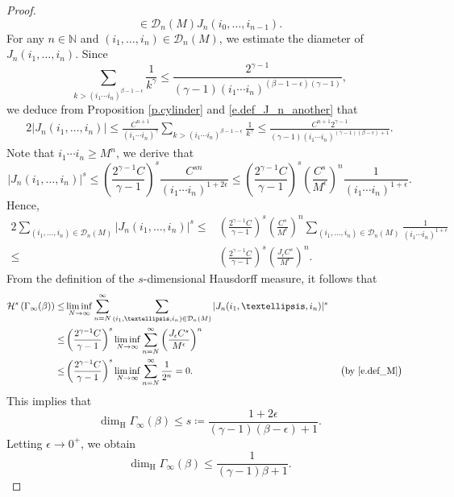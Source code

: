 \documentclass[10pt,a4paper]{amsart}
\begin{document}
\begin{proof}
\begin{equation}
{                \in \mathcal{D}_n(M)}J_n(i_0,\dots,i_{n-1}).
        \end{equation}
For any $n \in \mathbb N$ and $(i_1,\dots, i_{n})\in \mathcal{D} _n(M)$, we estimate the diameter of $J_n(i_1,\dots,i_{n})$. Since
$$
\sum_{k>(i_1\cdots i_{n})
        ^{\beta-1-\epsilon}}\frac{1}{k^{\gamma}} \leq \frac{2^{\gamma-1}}
        {(\gamma-1)(i_1\cdots i_{n})^{(\beta-1-\epsilon)(\gamma-1)}},
$$
we deduce from Proposition \ref{p.cylinder} and \eqref{e.def_J_n_another} that
     \begin{alignat*}{2}
        |J_n(i_1,\dots,i_{n})|\leq\frac{C^{n+1}}
        {(i_1\cdots i_{n})^{\gamma}}
        \sum_{k>(i_1\cdots i_{n})
        ^{\beta-1-\epsilon}}\frac{1}{k^{\gamma}}
       \leq \frac{C^{n+1}2^{\gamma-1}}
        {(\gamma-1)(i_1\cdots i_{n})^{(\gamma-1)(\beta-\epsilon)+1}}.
        \end{alignat*}
Note that $i_1\cdots i_{n}\geq M^n$, we derive that
 \begin{equation*}\label{J^s}
|J_n(i_1,\dots,i_{n})|^s \leq \left(\frac{2^{\gamma-1}C}{\gamma-1}\right)^s \frac{C^{sn}}
        {(i_1\cdots i_{n})^{1+2\epsilon}} \leq \left(\frac{2^{\gamma-1}C}{\gamma-1}\right)^s \left(\frac{C^{s}}{M^\epsilon}\right)^n \frac{1}
        {(i_1\cdots i_{n})^{1+\epsilon}}.
 \end{equation*}
 Hence,
\begin{alignat*}{2}
 \sum_{(i_1,\dots, i_{n})\in \mathcal{D} _n(M)}|J_n(i_1,\dots,i_{n})|^s \leq &\left(\frac{2^{\gamma-1}C}{\gamma-1}\right)^s \left(\frac{C^{s}}{M^\epsilon}\right)^n \sum_{(i_1,\dots, i_{n})\in \mathcal{D} _n(M)} \frac{1}
        {(i_1\cdots i_{n})^{1+\epsilon}}\\
\leq & \left(\frac{2^{\gamma-1}C}{\gamma-1}\right)^s \left(\frac{J_\epsilon C^{s}}{M^\epsilon}\right)^n.
\end{alignat*}
From the definition of the $s$-dimensional Hausdorff measure, it follows that
 \begin{alignat*}{2}
 \mathcal{H}^{s}\left({\Gamma}_{\infty}(\beta)\right)
                \leq& \liminf_{N \to \infty}
                \sum_{n=N}^{\infty}
                \sum_{(i_1,\dots, i_{n})
                \in \mathcal{D} _n(M)}
                |J_n(i_1,\dots,i_{n})|^s \\
                \leq & \left(\frac{2^{\gamma-1}C}{\gamma-1}\right)^s \liminf_{N \to \infty}
                \sum_{n=N}^{\infty}\left(\frac{J_\epsilon C^{s}}{M^\epsilon}\right)^n\\
                 \leq & \left(\frac{2^{\gamma-1}C}{\gamma-1}\right)^s \liminf_{N \to \infty}
                \sum_{n=N}^{\infty} \frac{1}{2^n} =0. && \  \big(\text{by}\ \eqref{e.def_M}\big)
        \end{alignat*}
This implies that
 \begin{equation*}
                \dim_{\mathrm{H}}
              {\Gamma}_{\infty}(\beta)
                \leq s\coloneqq \frac{1+2\epsilon}{(\gamma-1)(\beta-\epsilon)+1}.
        \end{equation*}
 Letting $\epsilon\to 0^{+}$, we obtain $$\dim_{\mathrm{H}}{\Gamma}_{\infty}
        (\beta)\leq \frac{1}{(\gamma-1)\beta+1}.$$



\end{proof}
\end{document}
